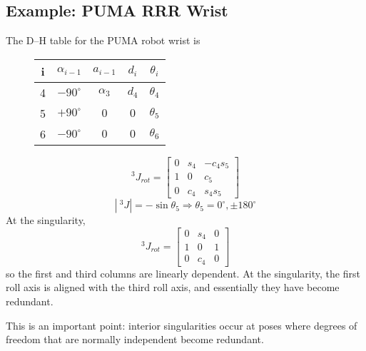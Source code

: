 \documentclass[]{article}
\begin{document}
\subsection{Example: PUMA RRR Wrist}
The D--H table for the PUMA robot wrist is
\begin{figure}[h!]
	\centering
	\begin{tabular}{c|cccc}
		i & $\alpha_{i-1}$ & $a_{i-1}$ & $d_{i}$ & $\theta_{i}$ \\ \hline
		4 & $-90^{\circ}$ & $\alpha_{3}$ & $d_{4}$ & $\theta_{4}$ \\
		5 & $+90^{\circ}$ & $0$ & $0$ & $\theta_{5}$ \\
		6 & $-90^{\circ}$ & $0$ & $0$ & $\theta_{6}$
	\end{tabular}
\end{figure}
\begin{displaymath}
	^{3}J_{rot} = \left[\begin{array}{ccc} 0 & s_{4} & -c_{4}s_{5} \\ 1 & 0 & c_{5} \\ 0 & c_{4} & s_{4}s_{5} \end{array}\right]
\end{displaymath}
\begin{displaymath}
|\ \!^{3}J| = -\sin{\theta_{5}} \Rightarrow \theta_{5} = 0^{\circ}, \pm 180^{\circ}
\end{displaymath}
At the singularity,
\begin{displaymath}
^{3}J_{rot} = \left[\begin{array}{ccc} 0 & s_{4} & 0 \\ 1 & 0 & 1 \\ 0 & c_{4} & 0 \end{array}\right]
\end{displaymath}
so the first and third columns are linearly dependent. At the singularity, the first roll axis is aligned with the third roll axis, and essentially they have become redundant.

This is an important point: interior singularities occur at poses where degrees of freedom that are normally independent become redundant.
\end{document}
